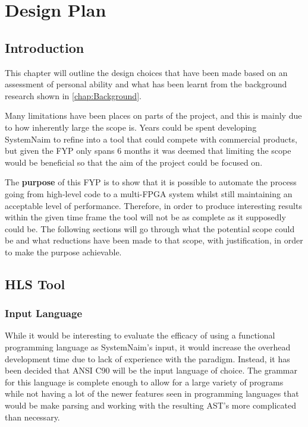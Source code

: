 \chapter{Design Plan}
\label{chap:Design}

\section{Introduction}
This chapter will outline the design choices that have been made based on an assessment of personal ability and what has been learnt from the background research shown in \autoref{chap:Background}.

Many limitations have been places on parts of the project, and this is mainly due to how inherently large the scope is. Years could be spent developing SystemNaim to refine into a tool that could compete with commercial products, but given the FYP only spans 6 months it was deemed that limiting the scope would be beneficial so that the aim of the project could be focused on.

The \textbf{purpose} of this FYP is to show that it is possible to automate the process going from high-level code to a multi-FPGA system whilst still maintaining an acceptable level of performance. Therefore, in order to produce interesting results within the given time frame the tool will not be as complete as it supposedly could be. The following sections will go through what the potential scope could be and what reductions have been made to that scope, with justification, in order to make the purpose achievable.

\section{HLS Tool}

\subsection{Input Language}

While it would be interesting to evaluate the efficacy of using a functional programming language as SystemNaim's input, it would increase the overhead development time due to lack of experience with the paradigm. Instead, it has been decided that ANSI C90 will be the input language of choice. The grammar for this language is complete enough to allow for a large variety of programs while not having a lot of the newer features seen in programming languages that would be make parsing and working with the resulting AST's more complicated than necessary. 

